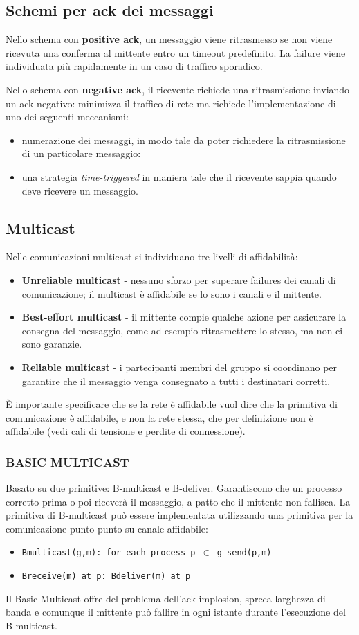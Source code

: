 \subsection{Schemi per ack dei messaggi}
Nello schema con \textbf{positive ack}, un messaggio viene ritrasmesso se non viene ricevuta una conferma al mittente entro un timeout predefinito. La failure viene individuata più rapidamente in un caso di traffico sporadico.

\vspace{5mm}
Nello schema con \textbf{negative ack}, il ricevente richiede una ritrasmissione inviando un ack negativo: minimizza il traffico di rete ma richiede l'implementazione di uno dei seguenti meccanismi:
\begin{itemize}
    \item numerazione dei messaggi, in modo tale da poter richiedere la ritrasmissione di un particolare messaggio:
    \item una strategia \textit{time-triggered} in maniera tale che il ricevente sappia quando deve ricevere un messaggio.
\end{itemize}
\subsection{Multicast}
Nelle comunicazioni multicast si individuano tre livelli di affidabilità:
\begin{itemize}
    \item \textbf{Unreliable multicast} - nessuno sforzo per superare failures dei canali di comunicazione; il multicast è affidabile se lo sono i canali e il mittente.
    \item \textbf{Best-effort multicast} - il mittente compie qualche azione per assicurare la consegna del messaggio, come ad esempio ritrasmettere lo stesso, ma non ci sono garanzie.
    \item \textbf{Reliable multicast} - i partecipanti membri del gruppo si coordinano per garantire che il messaggio venga consegnato a tutti i destinatari corretti.
\end{itemize}
È importante specificare che se la rete è affidabile vuol dire che la primitiva di comunicazione è affidabile, e non la rete stessa, che per definizione non è affidabile (vedi cali di tensione e perdite di connessione).
\subsubsection{BASIC MULTICAST}
Basato su due primitive: B-multicast e B-deliver. Garantiscono che un processo corretto prima o poi riceverà il messaggio, a patto che il mittente non fallisca. La primitiva di B-multicast può essere implementata utilizzando una primitiva per la comunicazione punto-punto su canale affidabile:
\begin{itemize}
    \item \texttt{Bmulticast(g,m): for each process p $\in$ g send(p,m)}
    \item \texttt{Breceive(m) at p: Bdeliver(m) at p}
\end{itemize}
Il Basic Multicast offre del problema dell'ack implosion, spreca larghezza di banda e comunque il mittente può fallire in ogni istante durante l'esecuzione del B-multicast.

